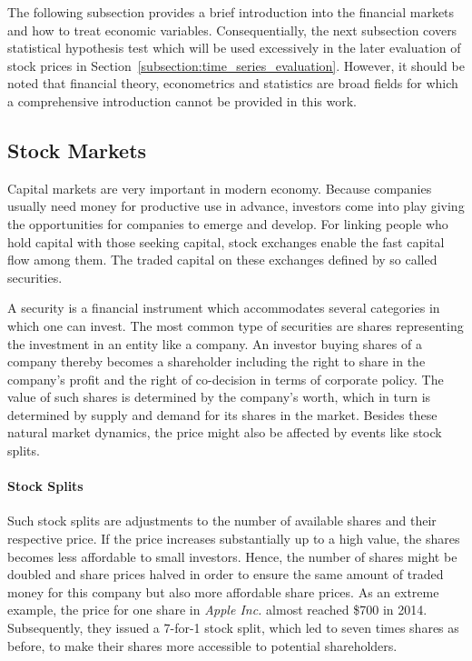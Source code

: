 The following subsection provides a brief introduction into the financial markets and how to treat economic variables. Consequentially, the next subsection covers statistical hypothesis test which will be used excessively in the later evaluation of stock prices in Section~\ref{subsection:time_series_evaluation}. However, it should be noted that financial theory, econometrics and statistics are broad fields for which a comprehensive introduction cannot be provided in this work.

\subsection{Stock Markets}



Capital markets are very important in modern economy. Because companies usually need money for productive use in advance, investors come into play giving the opportunities for companies to emerge and develop. For linking people who hold capital with those seeking capital, stock exchanges enable the fast capital flow among them. The traded capital on these exchanges defined by so called securities.

A security is a financial instrument which accommodates several categories in which one can invest. The most common type of securities are shares representing the investment in an entity like a company. An investor buying shares of a company thereby becomes a shareholder including the right to share in the company's profit and the right of co-decision in terms of corporate policy. The value of such shares is determined by the company's worth, which in turn is determined by supply and demand for its shares in the market. Besides these natural market dynamics, the price might also be affected by events like stock splits.

\paragraph{Stock Splits}
Such stock splits are adjustments to the number of available shares and their respective price. If the price increases substantially up to a high value, the shares becomes less affordable to small investors. Hence, the number of shares might be doubled and share prices halved in order to ensure the same amount of traded money for this company but also more affordable share prices. As an extreme example, the price for one share in \emph{Apple Inc.} almost reached \$700 in 2014. Subsequently, they issued a 7-for-1 stock split, which led to seven times shares as before, to make their shares more accessible to potential shareholders.

